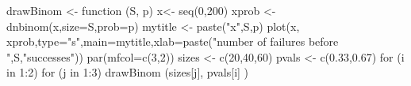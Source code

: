 \begin{Schunk}
\begin{Sinput}
 drawBinom <- function (S, p){
    x<- seq(0,200)
    xprob <- dnbinom(x,size=S,prob=p)
    mytitle <- paste("x",S,p)
    plot(x, xprob,type="s",main=mytitle,xlab=paste("number of failures before ",S,"successes"))
  }
 par(mfcol=c(3,2))
 sizes <- c(20,40,60)
 pvals <- c(0.33,0.67)
 for (i in 1:2){
     for (j in 1:3){
       drawBinom (sizes[j], pvals[i] )
    }
  }
\end{Sinput}
\end{Schunk}

